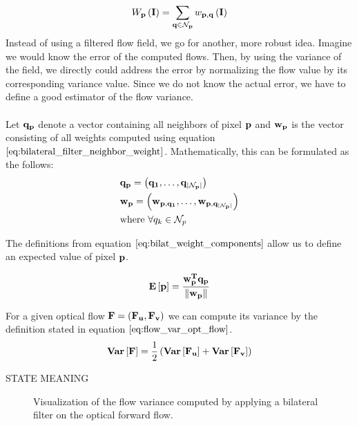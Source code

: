 \begin{equation}
	W_{\bf{p}} \left( \bf{I} \right) = \sum_{\bf{q} \in \mathcal{N}_p} w_{\bf{p}, \bf{q}} \left( \bf{I} \right)
\label{eq:bilateral_filter_weights}
\end{equation}
Instead of using a filtered flow field, we go for another, more robust idea. Imagine we would know the error of the computed flows. Then, by using the variance of the field, we directly could address the error by normalizing the flow value by its corresponding variance value. Since we do not know the actual error, we have to define a good estimator of the flow variance. \\ \\
Let $\bf{q}_p$ denote a vector containing all neighbors of pixel $\bf{p}$ and $\bf{w}_p$ is the vector consisting of all weights computed using equation $\ref{eq:bilateral_filter_neighbor_weight}$. Mathematically, this can be formulated as the follows:
\begin{equation}
\begin{aligned}
& \bf{q_p} = \left( q_1, \dots, q_{|\mathcal{N}_p|} \right) \\
& \bf{w_p} = \left( w_{p, q_1}, \dots, w_{p, q_{|\mathcal{N}_p|}} \right) \\
& \text{where } \forall q_k \in \mathcal{N}_p
\end{aligned}
\label{eq:bilat_weight_components}
\end{equation}

The definitions from equation $\ref{eq:bilat_weight_components}$ allow us to define an expected value of pixel $\bf{p}$.

\begin{equation}
	\mathbf{E} \left[ \bf{p} \right] = \frac{\bf{w}_{p}^{T} \bf{q}_p}{\left\lVert\bf{w}_{p}\right\rVert}
\end{equation}

For a given optical flow $\bf{F} = (\bf{F_u}, \bf{F_v})$ we can compute its variance by the definition stated in equation $\ref{eq:flow_var_opt_flow}$.
\begin{equation}
	\mathbf{Var} \left[ \bf{F} \right] = \frac{1}{2} \left( \mathbf{Var} \left[ \bf{F_u} \right] + \mathbf{Var} \left[ \bf{F_v} \right] \right)
\label{eq:flow_var_opt_flow}	
\end{equation}

STATE MEANING

\begin{figure}[H]
\begin{center}
\end{center}
\caption[Flow Variance]{Visualization of the flow variance computed by applying a bilateral filter on the optical forward flow.}
\label{fig:flow_variance}
\end{figure}


